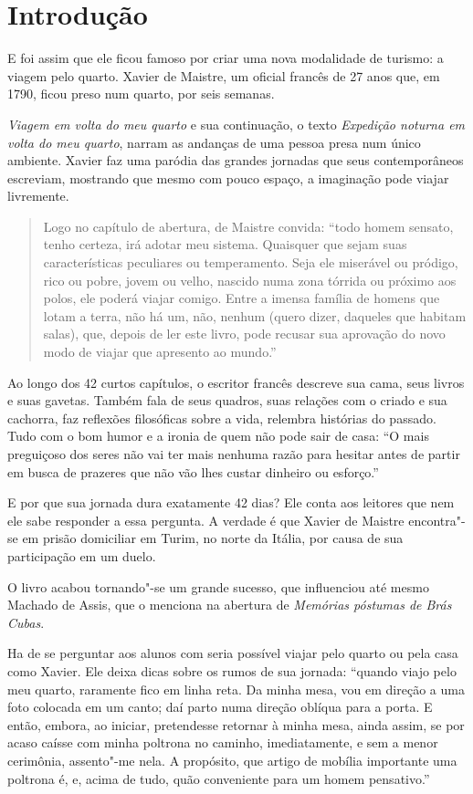 \documentclass[12pt]{extarticle}
\begin{document}
\tableofcontents


\section{Introdução}

E foi assim que ele ficou famoso por criar uma nova modalidade de turismo: a viagem pelo quarto.
Xavier de Maistre, um oficial francês de 27 anos que, em 1790, ficou preso num quarto, por seis semanas.

\textit{Viagem em volta do meu quarto} e sua continuação, o texto 
\textit{Expedição noturna em volta do meu quarto}, narram as andanças de uma pessoa presa num único ambiente. 
Xavier faz uma paródia das grandes jornadas que seus contemporâneos escreviam, 
mostrando que mesmo com pouco espaço, a imaginação pode viajar livremente.

\begin{quote}
Logo no capítulo de abertura, de Maistre convida: ``todo homem sensato, tenho certeza, irá adotar meu sistema. 
Quaisquer que sejam suas características peculiares ou temperamento. Seja ele miserável ou pródigo, rico ou pobre, jovem ou velho, nascido numa zona tórrida ou próximo aos polos, ele poderá viajar comigo. Entre a imensa família de homens que lotam a terra, não há um, não, nenhum (quero dizer, daqueles que habitam salas), que, depois de ler este livro, pode recusar sua aprovação do novo modo de viajar que apresento ao mundo.''
\end{quote}

Ao longo dos 42 curtos capítulos, o escritor francês descreve sua cama, 
seus livros e suas gavetas. Também fala de seus quadros, suas relações com o criado e 
sua cachorra, faz reflexões filosóficas sobre a vida, relembra histórias do passado. 
Tudo com o bom humor e a ironia de quem não pode sair de casa: ``O mais preguiçoso dos 
seres não vai ter mais nenhuma razão para hesitar antes de partir em busca de prazeres que não vão lhes custar dinheiro ou esforço.''

E por que sua jornada dura exatamente 42 dias? Ele conta aos leitores que nem ele sabe responder a essa pergunta. A verdade é que Xavier de Maistre encontra"-se em prisão domiciliar em Turim, no norte da Itália, por causa de sua participação em um duelo. 

O livro acabou tornando"-se um grande sucesso, que influenciou até mesmo Machado de Assis, 
que o menciona na abertura de \textit{Memórias póstumas de Brás Cubas}.

Ha de se perguntar aos alunos com seria possível viajar pelo quarto ou pela casa como Xavier. 
Ele deixa dicas sobre os rumos de sua jornada: ``quando viajo pelo meu quarto, 
raramente fico em linha reta. Da minha mesa, vou em direção a uma foto colocada 
em um canto; daí parto numa direção oblíqua para a porta.
E então, embora, ao iniciar, pretendesse retornar à minha mesa, ainda assim, se por acaso caísse com minha poltrona no caminho, imediatamente, e sem a menor cerimônia, assento"-me nela. A propósito, que artigo de mobília importante uma poltrona é, e, acima de tudo, quão conveniente para um homem pensativo.''
\end{document}
